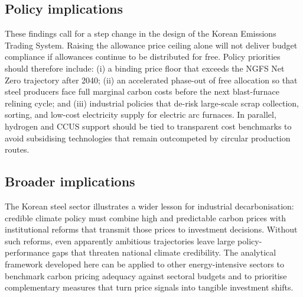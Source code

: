\documentclass[preprint,1p,authoryear]{elsarticle}
\begin{document}
\subsection{Policy implications}

These findings call for a step change in the design of the Korean Emissions Trading System. Raising the allowance price ceiling alone will not deliver budget compliance if allowances continue to be distributed for free. Policy priorities should therefore include: (i) a binding price floor that exceeds the NGFS Net Zero trajectory after 2040; (ii) an accelerated phase-out of free allocation so that steel producers face full marginal carbon costs before the next blast-furnace relining cycle; and (iii) industrial policies that de-risk large-scale scrap collection, sorting, and low-cost electricity supply for electric arc furnaces. In parallel, hydrogen and CCUS support should be tied to transparent cost benchmarks to avoid subsidising technologies that remain outcompeted by circular production routes.

\subsection{Broader implications}

The Korean steel sector illustrates a wider lesson for industrial decarbonisation: credible climate policy must combine high and predictable carbon prices with institutional reforms that transmit those prices to investment decisions. Without such reforms, even apparently ambitious trajectories leave large policy-performance gaps that threaten national climate credibility. The analytical framework developed here can be applied to other energy-intensive sectors to benchmark carbon pricing adequacy against sectoral budgets and to prioritise complementary measures that turn price signals into tangible investment shifts.




\end{document}
